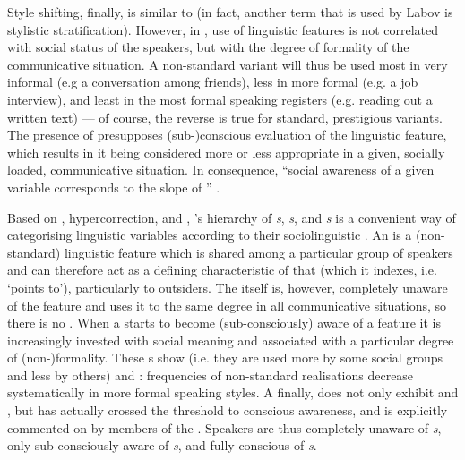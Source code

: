 Style shifting, finally, is similar to  (in fact, another term that is used by Labov is stylistic stratification).
However, in , use of linguistic features is not correlated with social status of the speakers, but with the degree of formality of the communicative situation.
A non-standard variant will thus be used most in very informal (e.g a conversation among friends), less in more formal (e.g. a job interview), and least in the most formal speaking registers (e.g. reading out a written text) --- of course, the reverse is true for standard, prestigious variants.
The presence of  presupposes (sub-)conscious evaluation of the linguistic feature, which results in it being considered more or less appropriate in a given, socially loaded, communicative situation.
In consequence, ``social awareness of a given variable corresponds to the slope of '' \parencite[196]{labov2001a}.

Based on , hypercorrection, and , \citeauthor{labov1972}'s \citeyear{labov1972} hierarchy of \emph{s}, \emph{s}, and \emph{s} is a convenient way of categorising linguistic variables according to their sociolinguistic .
An  is a (non-standard) linguistic feature which is shared among a particular group of speakers and can therefore act as a defining characteristic of that  (which it indexes, i.e. `points to'), particularly to outsiders.
The  itself is, however, completely unaware of the feature and uses it to the same degree in all communicative situations, so there is no .
When a  starts to become (sub-consciously) aware of a feature it is increasingly invested with social meaning and associated with a particular degree of (non-)formality.
These s show  (i.e. they are used more by some social groups and less by others) and : frequencies of non-standard realisations decrease systematically in more formal speaking styles.
A \emph{} finally, does not only exhibit  and , but has actually crossed the threshold to conscious awareness, and is explicitly commented on by members of the  \parencite[cf.][178--180]{labov1972}.
Speakers are thus completely unaware of \emph{s}, only sub-consciously aware of \emph{s}, and fully conscious of \emph{s}.

